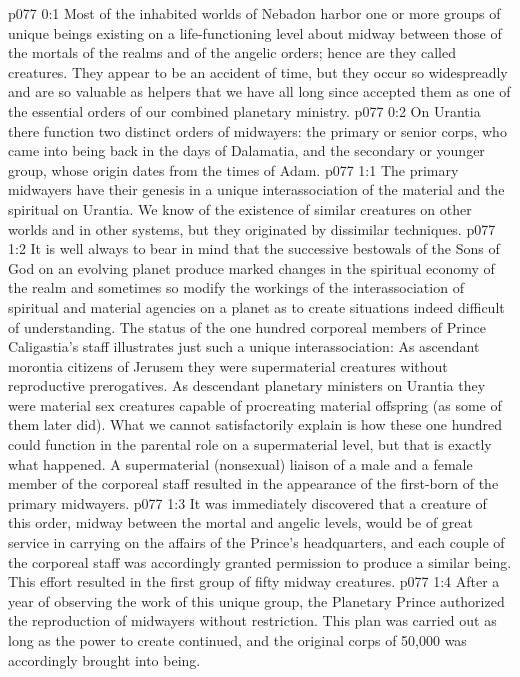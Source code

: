 \author{Archangel}
\vs p077 0:1 Most of the inhabited worlds of Nebadon harbor one or more groups of unique beings existing on a life\hyp{}functioning level about midway between those of the mortals of the realms and of the angelic orders; hence are they called  creatures. They appear to be an accident of time, but they occur so widespreadly and are so valuable as helpers that we have all long since accepted them as one of the essential orders of our combined planetary ministry.\plusone
\vs p077 0:2 On Urantia there function two distinct orders of midwayers: the primary or senior corps, who came into being back in the days of Dalamatia, and the secondary or younger group, whose origin dates from the times of Adam.
\vs p077 1:1 The primary midwayers have their genesis in a unique interassociation of the material and the spiritual on Urantia. We know of the existence of similar creatures on other worlds and in other systems, but they originated by dissimilar techniques.
\vs p077 1:2 It is well always to bear in mind that the successive bestowals of the Sons of God on an evolving planet produce marked changes in the spiritual economy of the realm and sometimes so modify the workings of the interassociation of spiritual and material agencies on a planet as to create situations indeed difficult of understanding. The status of the one hundred corporeal members of Prince Caligastia’s staff illustrates just such a unique interassociation: As ascendant morontia citizens of Jerusem they were supermaterial creatures without reproductive prerogatives. As descendant planetary ministers on Urantia they were material sex creatures capable of procreating material offspring (as some of them later did). What we cannot satisfactorily explain is how these one hundred could function in the parental role on a supermaterial level, but that is exactly what happened. A supermaterial (nonsexual) liaison of a male and a female member of the corporeal staff resulted in the appearance of the first\hyp{}born of the primary midwayers.\plusone
\vs p077 1:3 It was immediately discovered that a creature of this order, midway between the mortal and angelic levels, would be of great service in carrying on the affairs of the Prince’s headquarters, and each couple of the corporeal staff was accordingly granted permission to produce a similar being. This effort resulted in the first group of fifty midway creatures.
\vs p077 1:4 After a year of observing the work of this unique group, the Planetary Prince authorized the reproduction of midwayers without restriction. This plan was carried out as long as the power to create continued, and the original corps of 50,000 was accordingly brought into being.
